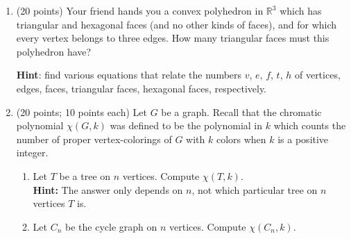 \documentclass[11pt]{article}
\begin{document}
\begin{enumerate}
\pagebreak

\item (20 points) Your friend hands you a convex polyhedron in $\mathbb{R}^3$ which has triangular and hexagonal faces (and no other kinds of faces), and for which every vertex belongs to three edges. How many triangular faces must this polyhedron have? 

{\bf Hint}: find various equations that relate the numbers $v$, $e$, $f$, $t$, $h$ of vertices, edges, faces, triangular faces, hexagonal faces, respectively.



\item (20 points; 10 points each) Let $G$ be a graph. Recall that the chromatic polynomial $\chi(G,k)$ was defined to be the polynomial in $k$ which counts the number of proper vertex-colorings of $G$ with $k$ colors when $k$ is a positive integer.
\begin{enumerate}
\item Let $T$ be a tree on $n$ vertices. Compute $\chi(T,k)$. \\
{\bf Hint:} The answer only depends on $n$, not which particular tree on $n$ vertices $T$ is.
\item Let $C_n$ be the cycle graph on $n$ vertices. Compute $\chi(C_n,k)$.
\end{enumerate}


\end{enumerate}
\end{document}
